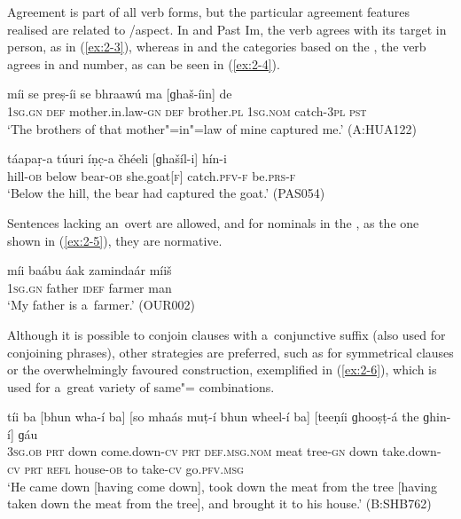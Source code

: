 Agreement is part of all  verb forms, but the particular agreement features realised are related to /aspect. In  and Past Im, the verb agrees with its target in person, as in (\ref{ex:2-3}), whereas in  and the categories based on the , the verb agrees in  and number, as can be seen in (\ref{ex:2-4}).

\begin{exe}
\ex
\label{ex:2-3}
\gll míi se preṣ-íi se bhraawú ma [ɡhaš-íin] de \\
\textsc{1sg.gn} \textsc{def} mother.in.law-\textsc{gn} \textsc{def} brother.\textsc{pl} \textsc{1sg.nom} catch-\textsc{3pl} \textsc{pst} \\
\glt `The brothers of that mother"=in"=law of mine captured me.' (A:HUA122)
\end{exe}

\begin{exe}
\ex
\label{ex:2-4}
\gll táapaṛ-a túuri íṇc̣-a čhéeli [ɡhašíl-i] hín-i \\ 
hill-\textsc{ob} below bear-\textsc{ob} she.goat[\textsc{f}] catch.\textsc{pfv-f} be.\textsc{prs-f} \\
\glt `Below the hill, the bear had captured the goat.' (PAS054)
\end{exe}

Sentences lacking an~overt  are allowed, and for  nominals in the  , as the one shown in (\ref{ex:2-5}), they are normative.

\begin{exe}
\ex
\label{ex:2-5}
\gll míi baábu áak zamindaár míiš \\ 
\textsc{1sg.gn} father \textsc{idef} farmer man \\
\glt `My father is a~farmer.' (OUR002)
\end{exe}
Although it is possible to conjoin clauses with a~conjunctive suffix (also used for conjoining  phrases), other strategies are preferred, such as  for symmetrical clauses or the overwhelmingly favoured  construction, exemplified in (\ref{ex:2-6}), which is used for a~great variety of same"=  combinations.

\begin{exe}
\ex
\label{ex:2-6}
\gll tíi ba [bhun wha-í ba] [so mhaás muṭ-í bhun wheel-í ba] [teeṇíi ɡhooṣṭ-á the ɡhin-í] ɡáu \\
\textsc{3sg.ob} \textsc{prt} down come.down-\textsc{cv} \textsc{prt} \textsc{def.msg.nom} meat tree-\textsc{gn} down take.down-\textsc{cv} \textsc{prt} \textsc{refl} house-\textsc{ob} to take-\textsc{cv} go.\textsc{pfv.msg} \\
\glt `He came down [having come down], took down the meat from the tree [having taken down the meat from the tree], and brought it to his house.' (B:SHB762)
\end{exe}

